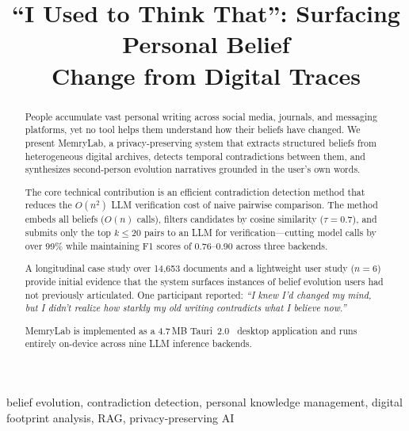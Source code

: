 \documentclass[conference]{IEEEtran}
\begin{document}
\title{``I Used to Think That'': Surfacing Personal Belief\\Change from Digital Traces}

\author{
}

\maketitle

\begin{abstract}
People accumulate vast personal writing across social media, journals, and messaging platforms, yet no tool helps them understand how their beliefs have changed. We present MemryLab, a privacy-preserving system that extracts structured beliefs from heterogeneous digital archives, detects temporal contradictions between them, and synthesizes second-person evolution narratives grounded in the user's own words.

The core technical contribution is an efficient contradiction detection method that reduces the $O(n^2)$ LLM verification cost of naive pairwise comparison. The method embeds all beliefs ($O(n)$ calls), filters candidates by cosine similarity ($\tau{=}0.7$), and submits only the top $k \leq 20$ pairs to an LLM for verification---cutting model calls by over 99\% while maintaining F1 scores of 0.76--0.90 across three backends.

A longitudinal case study over 14,653 documents and a lightweight user study ($n{=}6$) provide initial evidence that the system surfaces instances of belief evolution users had not previously articulated. One participant reported: \emph{``I knew I'd changed my mind, but I didn't realize how starkly my old writing contradicts what I believe now.''}

MemryLab is implemented as a 4.7\,MB Tauri~2.0~\cite{thompson2024tauri} desktop application and runs entirely on-device across nine LLM inference backends.
\end{abstract}

\begin{IEEEkeywords}
belief evolution, contradiction detection, personal knowledge management, digital footprint analysis, RAG, privacy-preserving AI
\end{IEEEkeywords}

\end{document}

